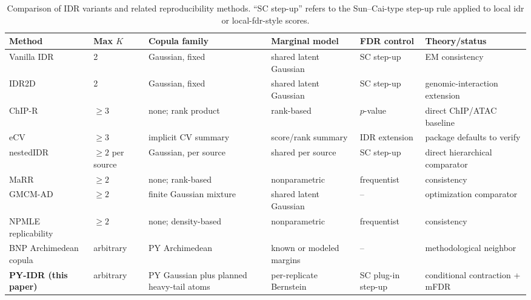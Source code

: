 \begin{table}[H]
\centering
{}
\caption{Comparison of IDR variants and related reproducibility methods. ``SC step-up'' refers to the Sun--Cai-type step-up rule applied to local idr or local-fdr-style scores.}
\label{tab:related-work}
\scriptsize
\setlength{\tabcolsep}{2pt}
\begin{tabularx}{\textwidth}{p{2.2cm}p{1.2cm}YYYY}
\toprule
Method & Max $K$ & Copula family & Marginal model & FDR control & Theory/status \\
\midrule
Vanilla IDR \citep{LiBrownHuangBickel2011} & 2 & Gaussian, fixed & shared latent Gaussian & SC step-up & EM consistency \\
IDR2D \citep{Krismer2020IDR2D} & 2 & Gaussian, fixed & shared latent Gaussian & SC step-up & genomic-interaction extension \\
ChIP-R \citep{Newell2021ChIPR} & $\geq3$ & none; rank product & rank-based & $p$-value & direct ChIP/ATAC baseline \\
eCV \citep{Iakovidis2024eCV} & $\geq3$ & implicit CV summary & score/rank summary & IDR extension & package defaults to verify \\
nestedIDR \citep{Ranalli2026nestedIDR} & $\geq2$ per source & Gaussian, per source & shared per source & SC step-up & direct hierarchical comparator \\
MaRR \citep{Philtron2018MaRR} & $\geq2$ & none; rank-based & nonparametric & frequentist & consistency \\
GMCM-AD \citep{KasaRajan2020GMCM} & $\geq2$ & finite Gaussian mixture & shared latent Gaussian & -- & optimization comparator \\
NPMLE replicability \citep{Yi2024NPMLE} & $\geq2$ & none; density-based & nonparametric & frequentist & consistency \\
BNP Archimedean copula \citep{PanNietoBarajasCraiu2024} & arbitrary & PY Archimedean & known or modeled margins & -- & methodological neighbor \\
\textbf{PY-IDR (this paper)} & arbitrary & PY Gaussian plus planned heavy-tail atoms & per-replicate Bernstein & SC plug-in step-up & conditional contraction + mFDR \\
\bottomrule
\end{tabularx}
\end{table}
